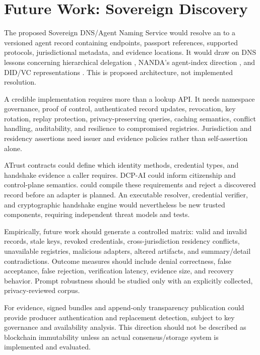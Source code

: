 \section{Future Work: Sovereign Discovery}\label{sec:future}

The proposed Sovereign DNS/Agent Naming Service would resolve an 
to a versioned agent record containing endpoints, passport references,
supported protocols, jurisdictional metadata, and evidence locations.  It
would draw on DNS lessons concerning hierarchical delegation
\citep{mockapetris1987dnsconcepts,mockapetris1987dnsimplementation}, NANDA's
agent-index direction \citep{raskar2025beyonddns}, and DID/VC representations
\citep{w3c_did_core_2022,w3c_vc_data_model_2025}.  This is proposed
architecture, not implemented resolution.

A credible implementation requires more than a lookup API.  It needs namespace
governance, proof of control, authenticated record updates, revocation, key
rotation, replay protection, privacy-preserving queries, caching semantics,
conflict handling, auditability, and resilience to compromised registries.
Jurisdiction and residency assertions need issuer and evidence policies rather
than self-assertion alone.

ATrust contracts could define which identity methods, credential types, and
handshake evidence a caller requires.  DCP-AI could inform citizenship and
control-plane semantics.  \Argorix could compile these requirements and reject
a discovered record before an adapter is planned.  An executable resolver,
credential verifier, and cryptographic handshake engine would nevertheless be
new trusted components, requiring independent threat models and tests.

Empirically, future work should generate a controlled matrix: valid and invalid
records, stale keys, revoked credentials, cross-jurisdiction residency
conflicts, unavailable registries, malicious adapters, altered artifacts, and
summary/detail contradictions.  Outcome measures should include denial
correctness, false acceptance, false rejection, verification latency, evidence
size, and recovery behavior.  Prompt robustness should be studied only with an
explicitly collected, privacy-reviewed corpus.

For evidence, signed bundles and append-only transparency publication could
provide producer authentication and replacement detection, subject to key
governance and availability analysis.  This direction should not be described
as blockchain immutability unless an actual consensus/storage system is
implemented and evaluated.

